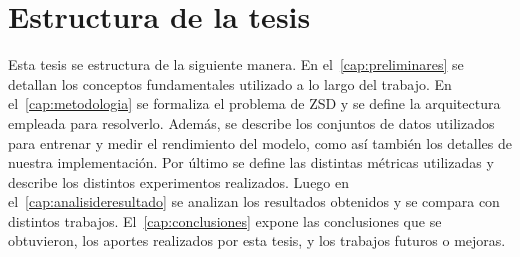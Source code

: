\section{Estructura de la tesis} \label{sec:estructuradelatesis}

Esta tesis se estructura de la siguiente manera. En el~\autoref{cap:preliminares} se detallan los conceptos fundamentales utilizado a lo largo del trabajo. En el~\autoref{cap:metodologia} se formaliza el problema de ZSD y se define la arquitectura empleada para resolverlo. Además, se describe los conjuntos de datos utilizados para entrenar y medir el rendimiento del modelo, como así también los detalles de nuestra implementación. Por último se define las distintas métricas utilizadas y describe los distintos experimentos realizados. Luego en el~\autoref{cap:analisideresultado} se analizan los resultados obtenidos y se compara con distintos trabajos. El~\autoref{cap:conclusiones} expone las conclusiones que se obtuvieron, los aportes realizados por esta tesis, y los trabajos futuros o mejoras.
